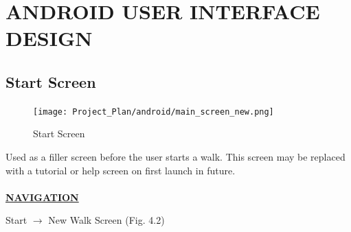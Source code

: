 \documentclass[12pt]{article}
\begin{document}
\section{ANDROID USER INTERFACE DESIGN}
\subsection{Start Screen}
\begin{figure}[htp]
\centering
\texttt{[image: Project\_Plan/android/main\_screen\_new.png]}
\caption{Start Screen}
\label{Start Screen}
\end{figure}
Used as a filler screen before the user starts a walk. This screen may be replaced with a tutorial or help screen on first launch in future. \\\\
\textbf{\uline{NAVIGATION}}
\par{Start $\rightarrow$ New Walk Screen (Fig. 4.2)} 
\clearpage
\end{document}
